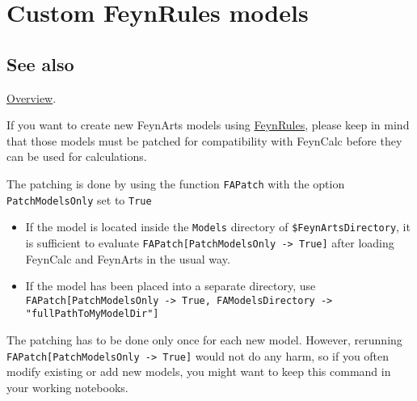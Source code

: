 \documentclass[../FeynCalcManual.tex]{subfiles}
\begin{document}
\hypertarget{custom feynrules models}{
\section{Custom FeynRules models}\label{custom feynrules models}}

\subsection{See also}

\hyperlink{toc}{Overview}.

If you want to create new FeynArts models using
\href{https://feynrules.irmp.ucl.ac.be/}{FeynRules}, please keep in mind
that those models must be patched for compatibility with FeynCalc before
they can be used for calculations.

The patching is done by using the function \texttt{FAPatch} with the
option \texttt{PatchModelsOnly} set to \texttt{True}

\begin{itemize}
\item
  If the model is located inside the \texttt{Models} directory of
  \texttt{\$FeynArtsDirectory}, it is sufficient to evaluate
  \texttt{FAPatch[\allowbreak{}PatchModelsOnly -> True]} after loading
  FeynCalc and FeynArts in the usual way.
\item
  If the model has been placed into a separate directory, use
  \texttt{FAPatch[\allowbreak{}PatchModelsOnly -> True,\ \allowbreak{}FAModelsDirectory ->    "fullPathToMyModelDir"]}
\end{itemize}

The patching has to be done only once for each new model. However,
rerunning \texttt{FAPatch[\allowbreak{}PatchModelsOnly -> True]} would
not do any harm, so if you often modify existing or add new models, you
might want to keep this command in your working notebooks.
\end{document}
